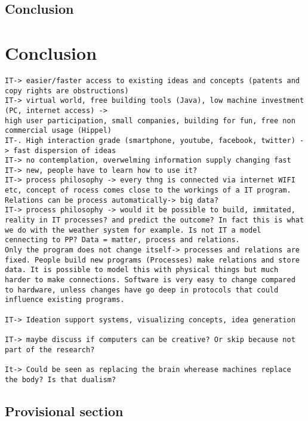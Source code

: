 \documentclass[a4paper]{Thesis}
\begin{document}
\section{Conclusion}

\chapter{Conclusion}

\begin{verbatim}
IT-> easier/faster access to existing ideas and concepts (patents and copy rights are obstructions)
IT-> virtual world, free building tools (Java), low machine investment (PC, internet access) -> 
high user participation, small companies, building for fun, free non commercial usage (Hippel)
IT-. High interaction grade (smartphone, youtube, facebook, twitter) -> fast dispersion of ideas
IT-> no contemplation, overwelming information supply changing fast
IT-> new, people have to learn how to use it?
IT-> process philosophy -> every thng is connected via internet WIFI etc, concept of rocess comes close to the workings of a IT program. Relations can be process automatically-> big data?
IT-> process philosophy -> would it be possible to build, immitated, reality in IT processes? and predict the outcome? In fact this is what we do with the weather system for example. Is not IT a model cennecting to PP? Data = matter, process and relations.
Only the program does not change itself-> processes and relations are fixed. People build new programs (Processes) make relations and store data. It is possible to model this with physical things but much harder to make connections. Software is very easy to change compared to hardware, unless changes have go deep in protocols that could influence existing programs.

IT-> Ideation support systems, visualizing concepts, idea generation

IT-> maybe discuss if computers can be creative? Or skip because not part of the research?

It-> Could be seen as replacing the brain wherease machines replace the body? Is that dualism?
\end{verbatim}

\section{Provisional section}

\bigskip


\end{document}
